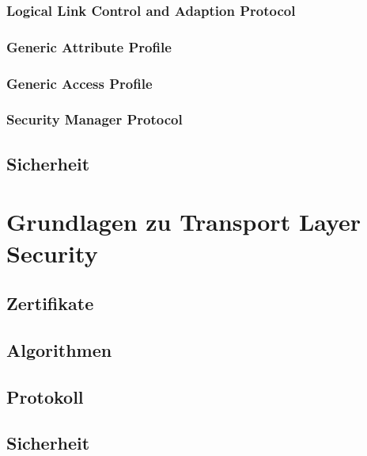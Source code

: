 \documentclass[doktyp=barbeit]{TUBAFarbeiten}
\begin{document}
		\subsubsection{Logical Link Control and Adaption Protocol}
			

		\subsubsection{Generic Attribute Profile}
			

		\subsubsection{Generic Access Profile}
			

		\subsubsection{Security Manager Protocol}
			

	\subsection{Sicherheit}

\newpage
\section{Grundlagen zu Transport Layer Security}

	\subsection{Zertifikate}

	\subsection{Algorithmen}

	\subsection{Protokoll}

	\subsection{Sicherheit}
\end{document}
